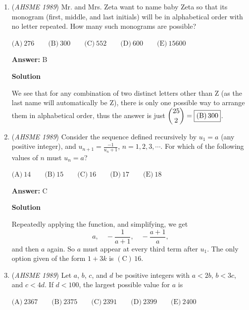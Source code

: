 \begin{enumerate}
 Let $a$ be the positive root.  Then $n = a^2+a = a(a+1)$.  Since $n$ must be between $1$ and $100$, $a$ may range from $1$ to $9$, giving a total of $\boxed{\textbf{(D)}\ 9}$ possible values for $n$.

 -j314andrews

 


	\item (\textit{AHSME 1989}) Mr. and Mrs. Zeta want to name baby Zeta so that its monogram (first, middle, and last initials) will be in alphabetical order with no letter repeated. How many such monograms are possible? 


 $\textrm{(A)}\ 276\qquad\textrm{(B)}\ 300\qquad\textrm{(C)}\ 552\qquad\textrm{(D)}\ 600\qquad\textrm{(E)}\ 15600$

 \textbf{Answer: }B



\textbf{Solution}

We see that for any combination of two distinct letters other than Z (as the last name will automatically be Z), there is only one possible way to arrange them in alphabetical order, thus the answer is just $\dbinom{25}{2}=\boxed{\mathrm{(B)\,300}}$.

 


	\item (\textit{AHSME 1989}) Consider the sequence defined recursively by $u_{1}= a$ (any positive integer), and $u_{n+1}=\frac{-1}{u_{n}+1}$,  $n = 1,2,3,\cdots$. For which of the following values of $n$ must $u_{n}=a$?


 $\textrm{(A)}\ 14\qquad\textrm{(B)}\ 15\qquad\textrm{(C)}\ 16\qquad\textrm{(D)}\ 17\qquad\textrm{(E)}\ 18$

 \textbf{Answer: }C



\textbf{Solution}

Repeatedly applying the function, and simplifying, we get 
 \[a,\quad-\frac1{a+1},\quad-\frac{a+1}a,\]and then $a$ again. So $a$ must appear at every third term after $u_1$. The only option given of the form $1+3k$ is $\boxed{\mathrm{(C)}\,16}$.

 


	\item (\textit{AHSME 1989}) Let $a$, $b$, $c$, and $d$ be positive integers with $a < 2b$, $b < 3c$, and $c<4d$. If $d<100$, the largest possible value for $a$ is


 $\textrm{(A)}\ 2367\qquad\textrm{(B)}\ 2375\qquad\textrm{(C)}\ 2391\qquad\textrm{(D)}\ 2399\qquad\textrm{(E)}\ 2400$


\end{enumerate}
